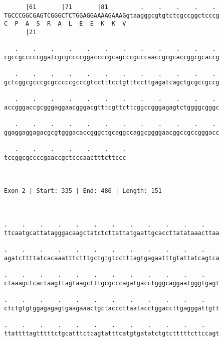 \documentclass{article}
\begin{document}
\begin{Verbatim}
      |61       |71       |81         .    .    .    .    . 
TGCCCGGCGAGTCGGGCTCTGGAGGAAAAGAAAGgtaagggcgtgtctcgccggctcccg
C  P  A  S  R  A  L  E  E  K  K  V                          
      |21                                                   
  
   .    .    .    .    .    .    .    .    .    .    .    . 
cgccgcccccggatcgcgccccggaccccgcagcccgcccaaccgcgcaccggcgcaccg
                                                            
   .    .    .    .    .    .    .    .    .    .    .    . 
gctcggcgcccgcgcccccgcccgtcctttcctgtttccttgagatcagctgcgccgccg
                                                            
   .    .    .    .    .    .    .    .    .    .    .    . 
accgggaccgcgggaggaacgggacgtttcgttcttcggccgggagagtctggggcgggc
                                                            
   .    .    .    .    .    .    .    .    .    .    .    . 
ggaggaggagacgcgtgggacaccgggctgcaggccaggcggggaacggccgccgggacc
                                                            
   .    .    .    .    .    .    .
tccggcgccccgaaccgctcccaactttcttccc
                                  
                                  
 
Exon 2 | Start: 335 | End: 486 | Length: 151



.    .    .    .    .    .    .    .    .    .    .    .    
ttcaatgcattatagggacaagctatctcttattatgaattgcaccttatataaacttaa
                                                            
.    .    .    .    .    .    .    .    .    .    .    .    
agatcttttatcacaaatttctttgctgtgtcctttagtgagaatttgtattatcagtca
                                                            
.    .    .    .    .    .    .    .    .    .    .    .    
ctaaagctcactaagttagtaagctttgcgcccagatgacctgggcaggaatgggtgagt
                                                            
.    .    .    .    .    .    .    .    .    .    .    .    
ctctgtgtggagagagtgaagaaactgctacccttaatacctggaccttgagggattgtt
                                                            
.    .    .    .    .    .    .    .    .    .    .    .    
ttattttagtttttctgcatttctcagtatttcatgtgatatctgtctttttcttccagt
                                                            

\end{Verbatim}
\end{document}
